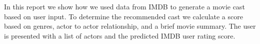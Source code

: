 In this report we show how we used data from IMDB\cite{IMDb} to generate a movie cast based on user input. To determine the 
recommended cast we calculate a score based on genres, actor to actor relationship, and a brief movie summary. The user
is presented with a list of actors and the predicted IMDB user rating score.